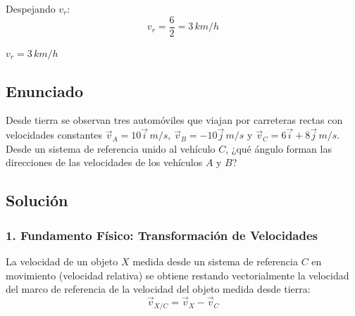 \documentclass[12pt, a4paper]{article}
\begin{document}
Despejando $v_r$:
\begin{equation}
    v_r = \frac{6}{2} = 3 \, \si{km/h}
\end{equation}

\begin{tcolorbox}[colback=green!5!white, colframe=green!50!black, title=Respuesta Final]
\centering \Large $v_r = 3 \, \si{km/h}$
\end{tcolorbox}

\newpage

\subsection*{Enunciado}

Desde tierra se observan tres automóviles que viajan por carreteras rectas con velocidades constantes $\vec{v}_A = 10 \vec{i} \, \si{m/s}$, $\vec{v}_B = -10 \vec{j} \, \si{m/s}$ y $\vec{v}_C = 6 \vec{i} + 8 \vec{j} \, \si{m/s}$. Desde un sistema de referencia unido al vehículo $C$, ¿qué ángulo forman las direcciones de las velocidades de los vehículos $A$ y $B$?

\begin{center}
\end{center}

\subsection*{Solución}

\subsubsection*{1. Fundamento Físico: Transformación de Velocidades}

La velocidad de un objeto $X$ medida desde un sistema de referencia $C$ en movimiento (velocidad relativa) se obtiene restando vectorialmente la velocidad del marco de referencia de la velocidad del objeto medida desde tierra:
\begin{equation}
    \vec{v}_{X/C} = \vec{v}_X - \vec{v}_C
\end{equation}
\end{document}
